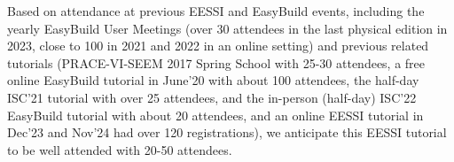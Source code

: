 Based on attendance at previous EESSI and EasyBuild events, including the yearly EasyBuild User Meetings (over 30
attendees in the last physical edition in 2023, close to 100 in 2021 and 2022 in an online setting) and previous
related tutorials (PRACE-VI-SEEM 2017 Spring School with 25-30 attendees, a free online EasyBuild tutorial in June'20
with about 100 attendees, the half-day ISC'21 tutorial with over 25 attendees, and the in-person (half-day) ISC'22
EasyBuild tutorial with about 20 attendees, and an online EESSI tutorial in Dec'23 and Nov'24 had over 120 registrations), we
anticipate this EESSI tutorial to be well attended with 20-50 attendees.




